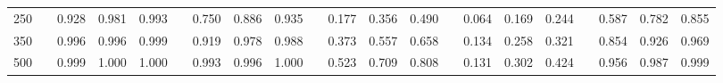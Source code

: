 % 
\begin{tabular}{ccccccccccccccccccccc}
  \hline
  \hline
250 &  & 0.928 & 0.981 & 0.993 &  & 0.750 & 0.886 & 0.935 &  & 0.177 & 0.356 & 0.490 &  & 0.064 & 0.169 & 0.244 &  & 0.587 & 0.782 & 0.855 \\ 
  350 &  & 0.996 & 0.996 & 0.999 &  & 0.919 & 0.978 & 0.988 &  & 0.373 & 0.557 & 0.658 &  & 0.134 & 0.258 & 0.321 &  & 0.854 & 0.926 & 0.969 \\ 
  500 &  & 0.999 & 1.000 & 1.000 &  & 0.993 & 0.996 & 1.000 &  & 0.523 & 0.709 & 0.808 &  & 0.131 & 0.302 & 0.424 &  & 0.956 & 0.987 & 0.999 \\ 
   \hline
\end{tabular}
